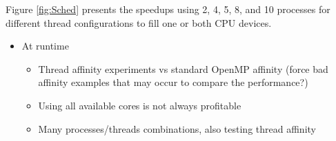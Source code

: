 Figure \ref{fig:Sched} presents the speedups using 2, 4, 5, 8, and 10 processes for different thread configurations to fill one or both CPU devices.

\begin{itemize}
	\item At runtime
	\begin{itemize}
		\item Thread affinity experiments vs standard OpenMP affinity (force bad affinity examples that may occur to compare the performance?)
		\item Using all available cores is not always profitable
		\item Many processes/threads combinations, also testing thread affinity
	\end{itemize}
\end{itemize}
